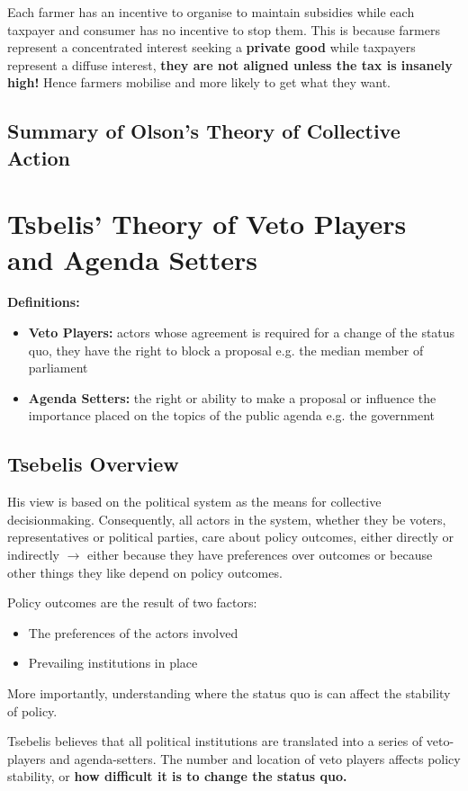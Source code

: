 \documentclass[12pt, letterpaper]{article}
\begin{document}
Each farmer has an incentive to organise to maintain subsidies while each taxpayer and consumer has no incentive to stop them. This is because farmers represent a concentrated interest seeking a \textbf{private good} while taxpayers represent a diffuse interest, \textbf{they are not aligned unless the tax is insanely high!} Hence farmers mobilise and more likely to get what they want.

\subsection{Summary of Olson's Theory of Collective Action}


\newpage
\section{Tsbelis' Theory of Veto Players and Agenda Setters}
\textbf{Definitions:}
\begin{itemize}
	\item \textbf{Veto Players:} actors whose agreement is required for a change of the status quo, they have the right to block a proposal e.g. the median member of parliament
	\item \textbf{Agenda Setters:} the right or ability to make a proposal or influence the importance placed on the topics of the public agenda e.g. the government
\end{itemize}

\subsection{Tsebelis Overview}
His view is based on the political system as the means for collective decisionmaking. Consequently, all actors in the system, whether they be voters, representatives or political parties, care about policy outcomes, either directly or indirectly $\rightarrow$ either because they have preferences over outcomes or because other things they like depend on policy outcomes.

Policy outcomes are the result of two factors:
\begin{itemize}
	\item The preferences of the actors involved
	\item Prevailing institutions in place
\end{itemize}
More importantly, understanding where the status quo is can affect the stability of policy.

Tsebelis believes that all political institutions are translated into a series of veto-players and agenda-setters. The number and location of veto players affects policy stability, or \textbf{how difficult it is to change the status quo.}
\end{document}
